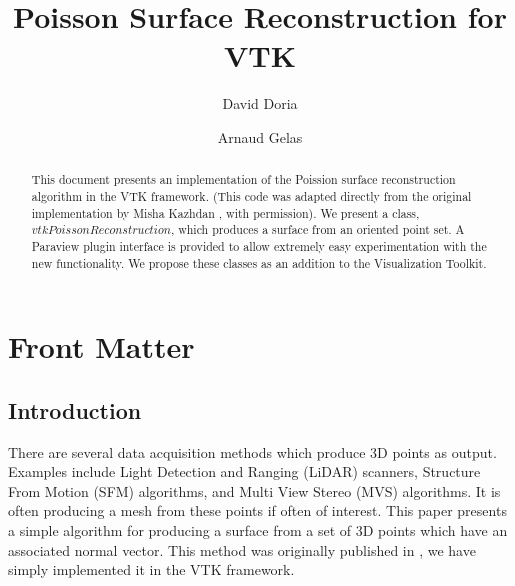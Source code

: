 \documentclass{InsightArticle}
\title{Poisson Surface Reconstruction for VTK}
\author{David Doria \and Arnaud Gelas}
\newcommand{\IJhandlerIDnumber}{3149}
\begin{document}
%
% 
\IJhandlefooter{\IJhandlerIDnumber}


\ifpdf
\else
\fi


\maketitle


\ifhtml
\chapter*{Front Matter\label{front}}
\fi


\begin{abstract}
\noindent
This document presents an implementation of the Poission surface reconstruction algorithm in the VTK framework. (This code was adapted directly from the original implementation by Misha Kazhdan \cite{reconstruction}, with permission). We present a class, $vtkPoissonReconstruction$, which produces a surface from an oriented point set. A Paraview plugin interface is provided to allow extremely easy experimentation with the new functionality. We propose these classes as an addition to the Visualization Toolkit.

\end{abstract}

\IJhandlenote{\IJhandlerIDnumber}

\tableofcontents

\section{Introduction}
There are several data acquisition methods which produce 3D points as output. Examples include Light Detection and Ranging (LiDAR) scanners, Structure From Motion (SFM) algorithms, and Multi View Stereo (MVS) algorithms. It is often producing a mesh from these points if often of interest. This paper presents a simple algorithm for producing a surface from a set of 3D points which have an associated normal vector. This method was originally published in \cite{reconstruction}, we have simply implemented it in the VTK framework.
\end{document}
